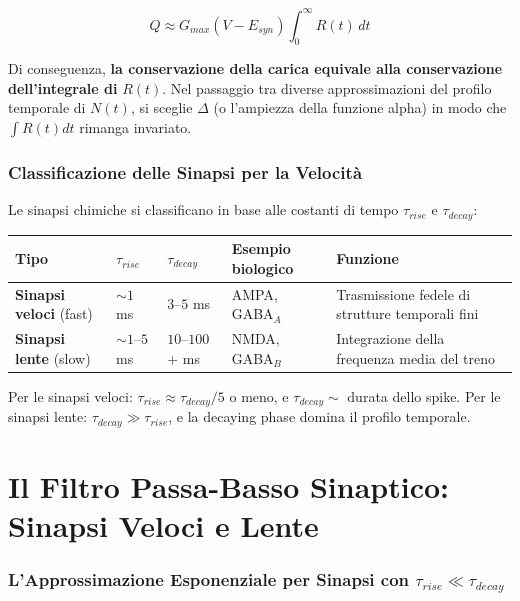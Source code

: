 \begin{equation}
Q \approx G_{max} (V - E_{syn}) \int_0^\infty R(t) \, dt
\end{equation}

Di conseguenza, \textbf{la conservazione della carica equivale alla conservazione dell'integrale di} $R(t)$. Nel passaggio tra diverse approssimazioni del profilo temporale di $N(t)$, si sceglie $\Delta$ (o l'ampiezza della funzione alpha) in modo che $\int R(t) dt$ rimanga invariato.

\subsubsection{Classificazione delle Sinapsi per la Velocità}

Le sinapsi chimiche si classificano in base alle costanti di tempo $\tau_{rise}$ e $\tau_{decay}$:

\begin{table}[htbp]
    \centering
    \renewcommand{\arraystretch}{1.3}
    \begin{tabularx}{\textwidth}{|l|l|l|X|X|}
    \hline
    \textbf{Tipo} & \textbf{$\tau_{rise}$} & \textbf{$\tau_{decay}$} & \textbf{Esempio biologico} & \textbf{Funzione} \\
    \hline
    \textbf{Sinapsi veloci} (fast) & $\sim 1$ ms & $3$–$5$ ms & AMPA, GABA$_A$ & Trasmissione fedele di strutture temporali fini \\
    \hline
    \textbf{Sinapsi lente} (slow) & $\sim 1$–$5$ ms & $10$–$100$+ ms & NMDA, GABA$_B$ & Integrazione della frequenza media del treno \\
    \hline
    \end{tabularx}
\end{table}

Per le sinapsi veloci: $\tau_{rise} \approx \tau_{decay}/5$ o meno, e $\tau_{decay} \sim$ durata dello spike.
Per le sinapsi lente: $\tau_{decay} \gg \tau_{rise}$, e la decaying phase domina il profilo temporale.



\section{Il Filtro Passa-Basso Sinaptico: Sinapsi Veloci e Lente}

\subsubsection{L'Approssimazione Esponenziale per Sinapsi con $\tau_{rise} \ll \tau_{decay}$}


